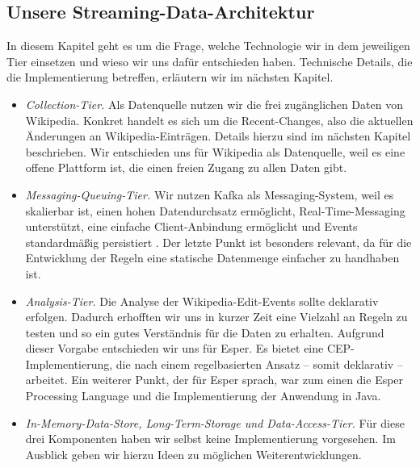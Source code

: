 \subsection{Unsere Streaming-Data-Architektur}
In diesem Kapitel geht es um die Frage, welche Technologie wir in dem jeweiligen Tier einsetzen und wieso wir uns dafür entschieden haben.
Technische Details, die die Implementierung betreffen, erläutern wir im nächsten Kapitel.
\begin{itemize}
    \item \textit{Collection-Tier.} Als Datenquelle nutzen wir die frei zugänglichen Daten von Wikipedia. Konkret handelt es sich um die Recent-Changes,
    also die aktuellen Änderungen an Wikipedia-Einträgen. Details hierzu sind im nächsten Kapitel beschrieben. Wir entschieden uns für Wikipedia als
    Datenquelle, weil es eine offene Plattform ist, die einen freien Zugang zu allen Daten gibt.

    \item \textit{Messaging-Queuing-Tier.} Wir nutzen Kafka als Messaging-System, weil es skalierbar ist, einen hohen Datendurchsatz ermöglicht,
    Real-Time-Messaging unterstützt, eine einfache Client-Anbindung ermöglicht und Events standardmäßig persistiert \cite{chellappan2018practical}. Der letzte Punkt ist
    besonders relevant, da für die Entwicklung der Regeln eine statische Datenmenge einfacher zu handhaben ist.

    \item \textit{Analysis-Tier.} Die Analyse der Wikipedia-Edit-Events sollte deklarativ erfolgen. Dadurch erhofften wir uns
    in kurzer Zeit eine Vielzahl an Regeln zu testen und so ein gutes Verständnis für die Daten zu erhalten. Aufgrund dieser Vorgabe
    entschieden wir uns für Esper. Es bietet eine CEP-Implementierung, die nach einem regelbasierten Ansatz -- somit deklarativ -- arbeitet.
    Ein weiterer Punkt, der für Esper sprach, war zum einen die Esper Processing Language und die Implementierung der Anwendung in Java.

    \item \textit{In-Memory-Data-Store, Long-Term-Storage und Data-Access-Tier.} Für diese drei Komponenten haben wir selbst keine Implementierung vorgesehen.
    Im Ausblick geben wir hierzu Ideen zu möglichen Weiterentwicklungen.
\end{itemize}